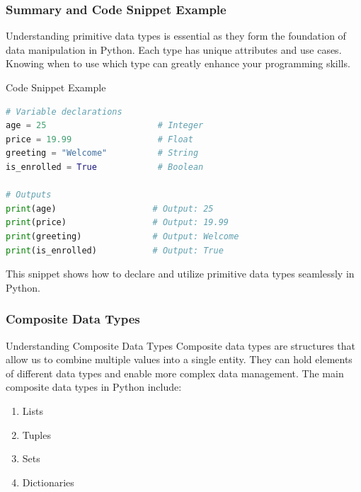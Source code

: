 \documentclass{beamer}
\begin{document}
\begin{frame}[fragile]
    \frametitle{Summary and Code Snippet Example}
    Understanding primitive data types is essential as they form the foundation of data manipulation in Python.
    Each type has unique attributes and use cases. Knowing when to use which type can greatly enhance your programming skills.
    
    \begin{block}{Code Snippet Example}
        \begin{lstlisting}[language=Python]
# Variable declarations
age = 25                      # Integer
price = 19.99                 # Float
greeting = "Welcome"          # String
is_enrolled = True            # Boolean

# Outputs
print(age)                   # Output: 25
print(price)                 # Output: 19.99
print(greeting)              # Output: Welcome
print(is_enrolled)           # Output: True
        \end{lstlisting}
    \end{block}
    
    This snippet shows how to declare and utilize primitive data types seamlessly in Python.
\end{frame}

\begin{frame}[fragile]
    \frametitle{Composite Data Types}
    \begin{block}{Understanding Composite Data Types}
        Composite data types are structures that allow us to combine multiple values into a single entity. 
        They can hold elements of different data types and enable more complex data management. 
        The main composite data types in Python include:
    \end{block}
    \begin{enumerate}
        \item Lists
        \item Tuples
        \item Sets
        \item Dictionaries
    \end{enumerate}
\end{frame}
\end{document}
